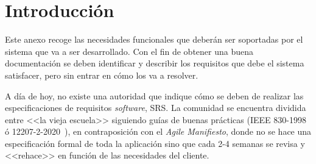 
\section{Introducción}
Este anexo recoge las necesidades funcionales que deberán ser soportadas por el sistema que va a ser desarrollado. Con el fin de obtener una buena documentación se deben identificar y describir los requisitos que debe el sistema satisfacer, pero sin entrar en cómo los va a resolver.

A día de hoy, no existe una autoridad que indique cómo se deben de realizar las especificaciones de requisitos \textit{software}, SRS. La comunidad se encuentra dividida entre <<la vieja escuela>> siguiendo guías de buenas prácticas (IEEE 830-1998~\cite{720574} ó 12207-2-2020~\cite{IEEE1220722020}), en contraposición con el \textit{Agile Manifiesto}, donde no se hace una especificación formal de toda la aplicación sino que cada 2-4 semanas se revisa y <<rehace>> en función de las necesidades del cliente.

